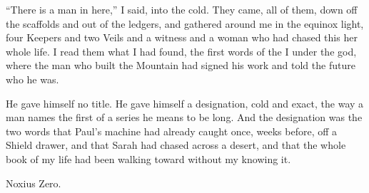 ``There is a man in here,'' I said, into the cold. They came, all of them, down off the scaffolds and out of the ledgers, and gathered around me in the equinox light, four Keepers and two Veils and a witness and a woman who had chased this her whole life. I read them what I had found, the first words of the I under the god, where the man who built the Mountain had signed his work and told the future who he was.\par

He gave himself no title. He gave himself a designation, cold and exact, the way a man names the first of a series he means to be long. And the designation was the two words that Paul's machine had already caught once, weeks before, off a Shield drawer, and that Sarah had chased across a desert, and that the whole book of my life had been walking toward without my knowing it.\par

Noxius Zero.\par
